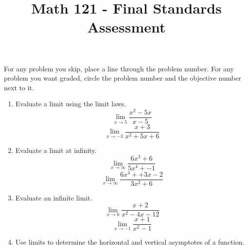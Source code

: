 \documentclass{exam}
\title{Math 121 - Final Standards Assessment}
\date{}
\begin{document}
\maketitle
\bigskip

\begin{center}
\large
    For any problem you skip, place a line through the problem number. For any problem you want graded, circle the problem number and the objective number next to it.
\end{center}
\normalsize

\begin{enumerate}
\item Evaluate a limit using the limit laws.\\
$$\lim_{x \rightarrow 5}  \frac{x^2 - 5x}{x-5}$$
$$\lim_{x \rightarrow -3} \frac{x+3}{x^2 + 5x + 6}$$
\item Evaluate a limit at infinity.\\
$$\lim_{x\rightarrow \infty} \frac{6x^3 + 6}{5x^4 + - 1}$$
$$\lim_{x\rightarrow \infty} \frac{6x^4 + +3x -2}{3x^2 + 6}$$
\item Evaluate an infinite limit.\\
$$\lim_{x \rightarrow 6} \frac{x+2}{x^2-4x-12}$$
$$\lim_{x \rightarrow -1} \frac{x+1}{x^2-1}$$
\item Use limits to determine the horizontal and vertical asymptotes of a function.\\

\end{enumerate}
\end{document}
